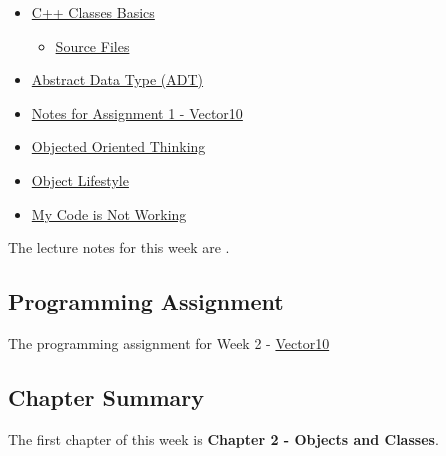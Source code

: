 \begin{itemize}
    \item \href{https://www.youtube.com/watch?v=5O2duDg0XGk}{C++ Classes Basics}
    \begin{itemize}
        \item \href{https://applied.cs.colorado.edu/mod/folder/view.php?id=45873}{Source Files}
    \end{itemize}
    \item \href{https://www.youtube.com/watch?v=AwnhJZeIM-A}{Abstract Data Type (ADT)}
    \item \href{https://www.youtube.com/watch?v=YkY2-O2ByuA}{Notes for Assignment 1 - Vector10}
    \item \href{https://applied.cs.colorado.edu/mod/hvp/view.php?id=45877}{Objected Oriented Thinking}
    \item \href{https://applied.cs.colorado.edu/mod/hvp/view.php?id=45878}{Object Lifestyle}
    \item \href{https://www.youtube.com/watch?v=uwLNltNof0A}{My Code is Not Working}
\end{itemize}
The lecture notes for this week are .

\subsection{Programming Assignment}

The programming assignment for Week 2 - \href{https://github.com/QuantumCompiler/CU/tree/main/CSPB%202270%20-%20Data%20Structures/CSPB%202270%20-%20Programming%20Assignments/CSPB%202270%20-%20Assignment%201%20-%20Vector10}{Vector10}

\subsection{Chapter Summary}

The first chapter of this week is \textbf{Chapter 2 - Objects and Classes}.

